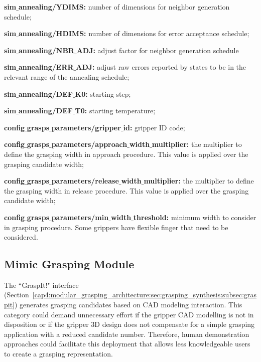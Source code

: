 \begin{itemize_jp}
    \item \textbf{sim$\_$annealing/YDIMS:} number of dimensions for neighbor generation schedule;
    \item \textbf{sim$\_$annealing/HDIMS:} number of dimensions for error acceptance schedule;
    \item \textbf{sim$\_$annealing/NBR$\_$ADJ:} adjust factor for neighbor generation schedule
    \item \textbf{sim$\_$annealing/ERR$\_$ADJ:} adjust raw errors reported by states to be in the relevant range of the annealing schedule;
    \item \textbf{sim$\_$annealing/DEF$\_$K0:} starting step;
    \item \textbf{sim$\_$annealing/DEF$\_$T0:} starting temperature;
    \item \textbf{config$\_$grasps$\_$parameters/gripper$\_$id:} gripper ID code;
    \item \textbf{config$\_$grasps$\_$parameters/approach$\_$width$\_$multiplier:} the multiplier to define the grasping width in approach procedure. This value is applied over the grasping candidate width;
    \item \textbf{config$\_$grasps$\_$parameters/release$\_$width$\_$multiplier:} the multiplier to define the grasping width in release procedure. This value is applied over the grasping candidate width;
    \item \textbf{config$\_$grasps$\_$parameters/min$\_$width$\_$threshold:} minimum width to consider in grasping procedure. Some grippers have flexible finger that need to be considered.
\end{itemize_jp}

\subsection{Mimic Grasping Module}
\label{cap4:modular_grasping_architecture:sec:grasping_synthesis:subsec:mimic_grasping}

The ``GraspIt!" interface (Section~\ref{cap4:modular_grasping_architecture:sec:grasping_synthesis:subsec:graspit}) generates grasping candidates based on CAD modeling interaction. This category could demand unnecessary effort if the gripper CAD modelling is not in disposition or if the gripper 3D design does not compensate for a simple grasping application with a reduced candidate number. Therefore, human demonstration approaches could facilitate this deployment that allows less knowledgeable users to create a grasping representation.  

